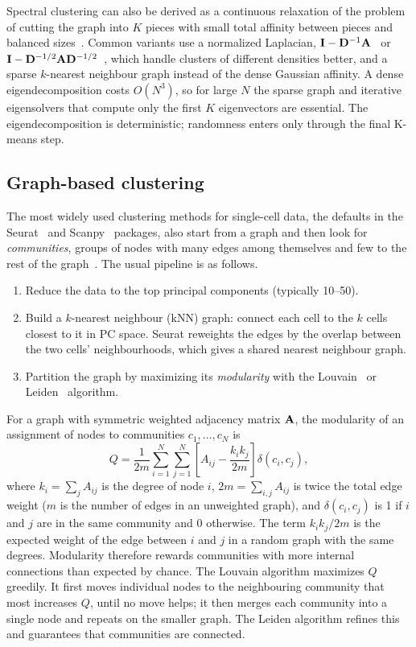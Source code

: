 Spectral clustering can also be derived as a continuous relaxation of the problem of cutting the graph into $K$ pieces with small total affinity between pieces and balanced sizes~\citep{vonluxburg2007}. Common variants use a normalized Laplacian, $\mathbf{I}-\mathbf{D}^{-1}\mathbf{A}$~\citep{shi2000} or $\mathbf{I}-\mathbf{D}^{-1/2}\mathbf{A}\mathbf{D}^{-1/2}$~\citep{ng2002}, which handle clusters of different densities better, and a sparse $k$-nearest neighbour graph instead of the dense Gaussian affinity. A dense eigendecomposition costs $O(N^3)$, so for large $N$ the sparse graph and iterative eigensolvers that compute only the first $K$ eigenvectors are essential. The eigendecomposition is deterministic; randomness enters only through the final K-means step.

\subsection{Graph-based clustering}
\label{sec:graph}

The most widely used clustering methods for single-cell data, the defaults in the Seurat~\citep{hao2021} and Scanpy~\citep{wolf2018} packages, also start from a graph and then look for \emph{communities}, groups of nodes with many edges among themselves and few to the rest of the graph~\citep{levine2015}. The usual pipeline is as follows.
\begin{enumerate}
  \item Reduce the data to the top principal components (typically 10--50).
  \item Build a $k$-nearest neighbour (kNN) graph: connect each cell to the $k$ cells closest to it in PC space. Seurat reweights the edges by the overlap between the two cells' neighbourhoods, which gives a shared nearest neighbour graph.
  \item Partition the graph by maximizing its \emph{modularity} with the Louvain~\citep{blondel2008} or Leiden~\citep{traag2019} algorithm.
\end{enumerate}
For a graph with symmetric weighted adjacency matrix $\mathbf{A}$, the modularity of an assignment of nodes to communities $c_1,\dots,c_N$ is~\citep{newman2004}
\begin{equation}
  Q = \frac{1}{2m}\sum_{i=1}^N\sum_{j=1}^N\left[A_{ij}-\frac{k_ik_j}{2m}\right]\delta(c_i,c_j),
  \label{eq:modularity}
\end{equation}
where $k_i=\sum_j A_{ij}$ is the degree of node $i$, $2m=\sum_{i,j}A_{ij}$ is twice the total edge weight ($m$ is the number of edges in an unweighted graph), and $\delta(c_i,c_j)$ is 1 if $i$ and $j$ are in the same community and 0 otherwise. The term $k_ik_j/2m$ is the expected weight of the edge between $i$ and $j$ in a random graph with the same degrees. Modularity therefore rewards communities with more internal connections than expected by chance. The Louvain algorithm maximizes $Q$ greedily. It first moves individual nodes to the neighbouring community that most increases $Q$, until no move helps; it then merges each community into a single node and repeats on the smaller graph. The Leiden algorithm refines this and guarantees that communities are connected.

